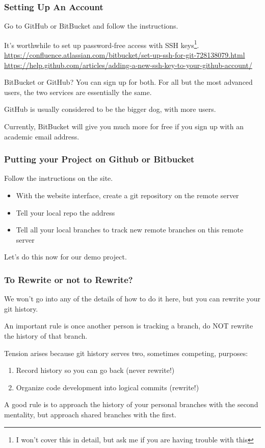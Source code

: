 \documentclass{beamer}
\begin{document}
\begin{frame}[fragile]
\frametitle{Setting Up An Account}
Go to GitHub or BitBucket and follow the instructions. 

It's worthwhile to set up password-free access with SSH keys\footnote{I won't cover this in detail, but ask me if you are having trouble with this}.
\href{https://confluence.atlassian.com/bitbucket/set-up-ssh-for-git-728138079.html}{https://confluence.atlassian.com/bitbucket/set-up-ssh-for-git-728138079.html}
\href{https://help.github.com/articles/adding-a-new-ssh-key-to-your-github-account/}{https://help.github.com/articles/adding-a-new-ssh-key-to-your-github-account/}

BitBucket or GitHub? You can sign up for both. For all but the most advanced users, the two services are essentially the same. 

GitHub is usually considered to be the bigger dog, with more users.

Currently, BitBucket will give you much more for free if you sign up with an academic email address.
\end{frame}

\begin{frame}[fragile]
\frametitle{Putting your Project on Github or Bitbucket}
Follow the instructions on the site.
\begin{itemize}
\item With the website interface, create a git repository on the remote server
\item Tell your local repo the address
\item Tell all your local branches to track new remote branches on this remote server
\end{itemize}

Let's do this now for our demo project.

\end{frame}

\begin{frame}[fragile]
\frametitle{To Rewrite or not to Rewrite?}
We won't go into any of the details of how to do it here, but you can rewrite your git history.

An important rule is once another person is tracking a branch, do NOT rewrite the history of that branch. 

Tension arises because git history serves two, sometimes competing, purposes:
\begin{enumerate}
\item Record history so you can go back (never rewrite!)
\item Organize code development into logical commits (rewrite!)
\end{enumerate}

A good rule is to approach the history of your personal branches with the second mentality, but 
approach shared branches with the first.

\end{frame}
\end{document}
